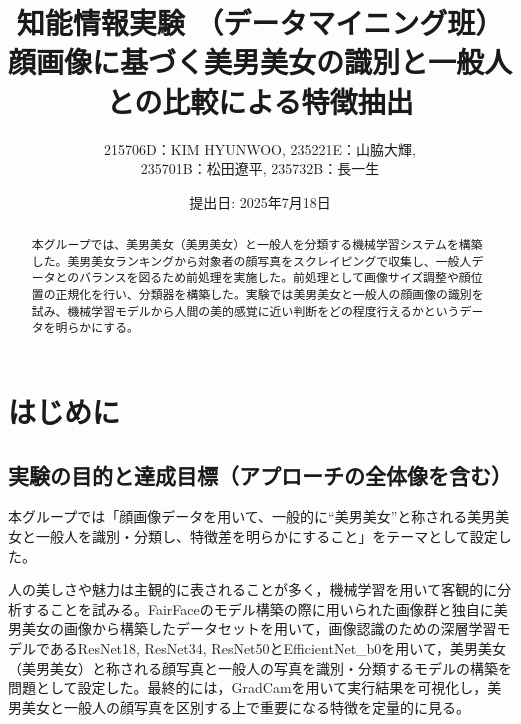 \documentclass[a4paper,11pt,titlepage]{jsarticle}
\begin{document}
\title{知能情報実験 （データマイニング班）\\顔画像に基づく美男美女の識別と一般人との比較による特徴抽出}
\author{215706D：KIM HYUNWOO, 235221E：山脇大輝,\\ 235701B：松田遼平, 235732B：長一生}
\date{提出日: 2025年7月18日}
\maketitle

\tableofcontents
\clearpage

\begin{abstract}
\label{label:abstract}
本グループでは、美男美女（美男美女）と一般人を分類する機械学習システムを構築した。美男美女ランキングから対象者の顔写真をスクレイピングで収集し、一般人データとのバランスを図るため前処理を実施した。前処理として画像サイズ調整や顔位置の正規化を行い、分類器を構築した。実験では美男美女と一般人の顔画像の識別を試み、機械学習モデルから人間の美的感覚に近い判断をどの程度行えるかというデータを明らかにする。
\end{abstract} 


\section{はじめに}
\label{label:はじめに}
\subsection{実験の目的と達成目標（アプローチの全体像を含む）}
本グループでは「顔画像データを用いて、一般的に“美男美女”と称される美男美女と一般人を識別・分類し、特徴差を明らかにすること」をテーマとして設定した。

人の美しさや魅力は主観的に表されることが多く，機械学習を用いて客観的に分析することを試みる。FairFaceのモデル構築の際に用いられた画像群と独自に美男美女の画像から構築したデータセットを用いて，画像認識のための深層学習モデルであるResNet18, ResNet34, ResNet50とEfficientNet\_b0を用いて，美男美女（美男美女）と称される顔写真と一般人の写真を識別・分類するモデルの構築を問題として設定した。最終的には，GradCamを用いて実行結果を可視化し，美男美女と一般人の顔写真を区別する上で重要になる特徴を定量的に見る。
\end{document}
